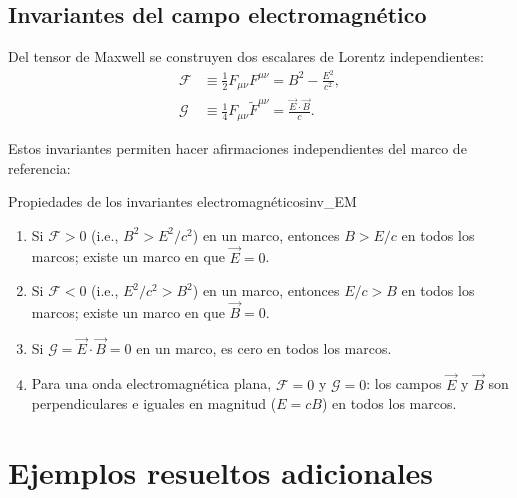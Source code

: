 \subsection{Invariantes del campo electromagnético}

Del tensor de Maxwell se construyen dos escalares de Lorentz independientes:
\begin{align}
  \mathcal{F} &\equiv \frac{1}{2}F_{\mu\nu}F^{\mu\nu}
  = B^2 - \frac{E^2}{c^2}, \label{eq:inv1EM}\\[4pt]
  \mathcal{G} &\equiv \frac{1}{4}F_{\mu\nu}\widetilde{F}^{\mu\nu}
  = \frac{\vec{E}\cdot\vec{B}}{c}. \label{eq:inv2EM}
\end{align}

Estos invariantes permiten hacer afirmaciones independientes del marco de referencia:

\begin{proposicion}{Propiedades de los invariantes electromagnéticos}{inv_EM}
\begin{enumerate}[leftmargin=2em]
  \item Si $\mathcal{F} > 0$ (i.e., $B^2 > E^2/c^2$) en un marco, entonces $B > E/c$ en todos los marcos; existe un marco en que $\vec{E} = 0$.
  \item Si $\mathcal{F} < 0$ (i.e., $E^2/c^2 > B^2$) en un marco, entonces $E/c > B$ en todos los marcos; existe un marco en que $\vec{B} = 0$.
  \item Si $\mathcal{G} = \vec{E}\cdot\vec{B} = 0$ en un marco, es cero en todos los marcos.
  \item Para una onda electromagnética plana, $\mathcal{F} = 0$ y $\mathcal{G} = 0$: los campos $\vec{E}$ y $\vec{B}$ son perpendiculares e iguales en magnitud ($E = cB$) en todos los marcos.
\end{enumerate}
\end{proposicion}

\section{Ejemplos resueltos adicionales}

